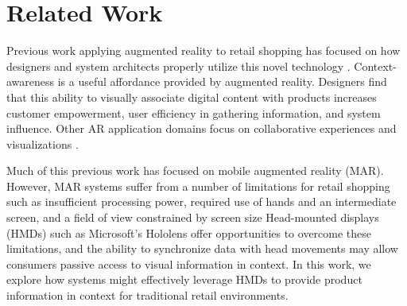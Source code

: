 \section{Related Work}

Previous work applying augmented reality to retail shopping has focused on how designers and system architects properly utilize this novel technology \cite{ahn2015supporting,kourouthanassis2007enhancing,olsson2013expected,spreer2012improving,stoyanova2015comparison,zhu2004personalized}.   Context-awareness is a useful affordance provided by augmented reality.  Designers find that this ability to visually associate digital content with products increases customer empowerment, user efficiency in gathering information, and system influence.  Other AR application domains focus on collaborative experiences and visualizations \cite{esser2016head,santos2016augmented,truong2013today}. 


Much of this previous work has focused on mobile augmented reality (MAR). However, MAR systems suffer from a number of limitations for retail shopping such as insufficient processing power, required use of hands and an intermediate screen, and a field of view constrained by screen size \cite{bimber2005spatial}   Head-mounted displays (HMDs) such as Microsoft's Hololens offer opportunities to overcome these limitations, and the ability to synchronize data with head movements may allow consumers passive access to visual information in context. In this work, we explore how systems might effectively leverage HMDs to provide product information in context for traditional retail environments. 

